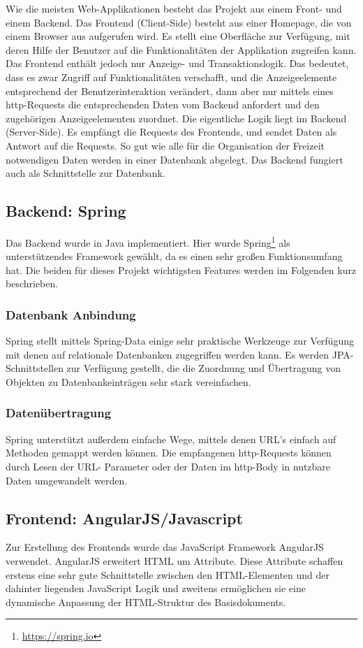 Wie die meisten Web-Applikationen besteht das Projekt aus einem Front- und einem Backend. Das Frontend (Client-Side) besteht aus einer Homepage, die von einem Browser aus aufgerufen wird. Es stellt eine Oberfläche zur Verfügung, mit deren Hilfe der Benutzer auf die Funktionalitäten der Applikation zugreifen kann. Das Frontend enthält jedoch nur Anzeige- und Transaktionslogik. Das bedeutet, dass es zwar Zugriff auf Funktionalitäten verschafft, und die Anzeigeelemente entsprechend der Benutzerinteraktion verändert, dann aber nur mittels eines http-Requests die entsprechenden Daten vom Backend anfordert und den zugehörigen Anzeigeelementen zuordnet. Die eigentliche Logik liegt im Backend (Server-Side). Es empfängt die Requests des Frontends, und sendet Daten als Antwort auf die Requests. So gut wie alle für die Organisation der Freizeit notwendigen Daten werden in einer Datenbank abgelegt. Das Backend fungiert auch als Schnittstelle zur Datenbank.   

\subsection{Backend: Spring}
Das Backend wurde in Java implementiert. Hier wurde Spring\footnote{\url{https://spring.io}} als unterstützendes Framework gewählt, da es einen sehr großen Funktionsumfang hat. Die beiden für dieses Projekt wichtigsten Features werden im Folgenden kurz beschrieben.

\subsubsection{Datenbank Anbindung}
Spring stellt mittels Spring-Data einige sehr praktische Werkzeuge zur Verfügung mit denen auf relationale Datenbanken zugegriffen werden kann. Es werden JPA-Schnittstellen zur Verfügung gestellt, die die Zuordnung und Übertragung von Objekten zu Datenbankeinträgen sehr stark vereinfachen.

\subsubsection{Datenübertragung}
Spring unterstützt außerdem einfache Wege, mittels denen URL's einfach auf Methoden gemappt werden können. Die empfangenen http-Requests können durch Lesen der URL- Parameter oder der Daten im http-Body in nutzbare Daten umgewandelt werden.

\subsection{Frontend: AngularJS/Javascript}
Zur Erstellung des Frontends wurde das JavaScript Framework AngularJS verwendet. AngularJS erweitert HTML um Attribute. Diese Attribute schaffen erstens eine sehr gute Schnittstelle zwischen den HTML-Elementen und der dahinter liegenden JavaScript Logik und zweitens ermöglichen sie eine dynamische Anpassung der HTML-Struktur des Basisdokuments.
